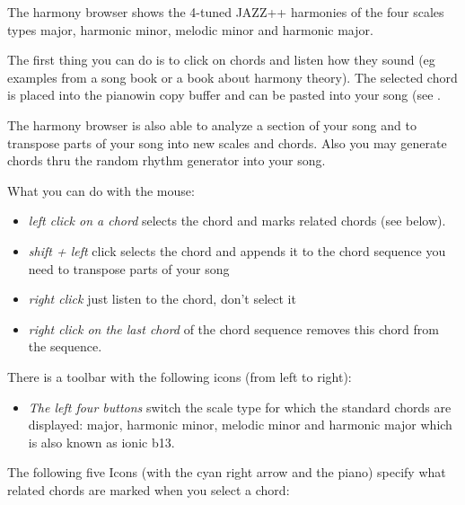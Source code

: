 \documentclass[letterpaper]{report}
\begin{document}
The harmony browser shows the 4-tuned JAZZ++ harmonies of the four scales
types major, harmonic minor, melodic minor and harmonic major.

The first thing you can do is to click on chords and listen how they sound (eg
examples from a song book or a book about harmony theory). The selected
chord is placed into the pianowin copy buffer and can be pasted into
your song (see .

The harmony browser is also able to analyze a section of your song and
to transpose parts of your song into new scales and chords. Also you may generate
chords thru the random rhythm generator into your song.

What you can do with the mouse:
\begin{itemize}
\item {\em left click on a chord} selects the chord and marks related chords (see below).
\item {\em shift + left} click selects the chord and appends it to the chord sequence
you need to transpose parts of your song
\item {\em right click} just listen to the chord, don't select it
\item {\em right click on the last chord} of the chord sequence removes this
chord from the sequence.
\end{itemize}

There is a toolbar with the following icons (from left to right):

\begin{itemize}

\item {\em The left four buttons} switch the scale type for which the standard
chords are displayed: major, harmonic minor, melodic minor and harmonic
major which is also known as ionic b13.

\end{itemize}

The following five Icons (with the cyan right arrow and the piano)
specify what related chords are marked when you select a chord:
\end{document}
